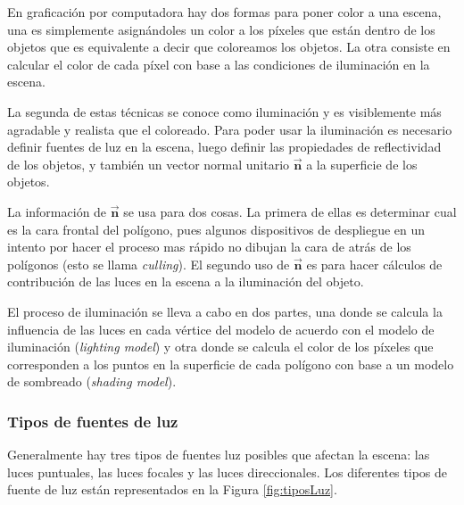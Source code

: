 En graficación por computadora hay dos formas para poner color a una escena, una es simplemente asignándoles un color a los píxeles que están dentro de los objetos que es equivalente a decir que coloreamos los objetos. La otra consiste en calcular el color de cada píxel con base a las condiciones de iluminación en la escena.

La segunda de estas técnicas se conoce como iluminación y es visiblemente más agradable y realista que el coloreado. Para poder usar la iluminación es necesario definir fuentes de luz en la escena, luego definir las propiedades de reflectividad de los objetos, y también un vector normal unitario $\vec{\textbf{n}}$ a la superficie de los objetos.

La información de $\vec{\textbf{n}}$ se usa para dos cosas. La primera de ellas es determinar cual es la cara frontal del polígono, pues algunos dispositivos de despliegue en un intento por hacer el proceso mas rápido no dibujan la cara de atrás de los polígonos (esto se llama \emph{culling}). El segundo uso de $\vec{\textbf{n}}$ es para hacer cálculos de contribución de las luces en la escena a la iluminación del objeto.

El proceso de iluminación se lleva a cabo en dos partes, una donde se calcula la influencia de las luces en cada vértice del modelo de acuerdo con el modelo de iluminación (\emph{lighting model}) y otra donde se calcula el color de los píxeles que corresponden a los puntos en la superficie de cada polígono con base a un modelo de sombreado (\emph{shading model}).



\subsubsection{Tipos de fuentes de luz}

Generalmente hay tres tipos de fuentes luz posibles que afectan la escena: las luces puntuales, las luces focales y las luces direccionales. Los diferentes tipos de fuente de luz están representados en la Figura \ref{fig:tiposLuz}.

